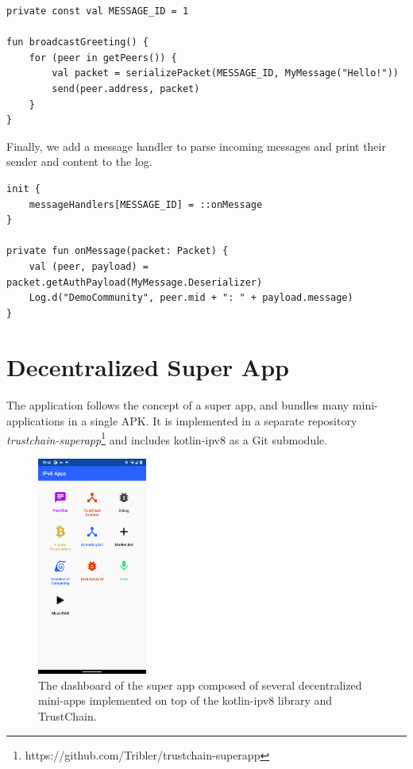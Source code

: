 \begin{verbatim}
private const val MESSAGE_ID = 1

fun broadcastGreeting() {
    for (peer in getPeers()) {
        val packet = serializePacket(MESSAGE_ID, MyMessage("Hello!"))
        send(peer.address, packet)
    }
}
\end{verbatim}

Finally, we add a message handler to parse incoming messages and print their sender and content to the log.

\begin{verbatim}
init {
    messageHandlers[MESSAGE_ID] = ::onMessage
}

private fun onMessage(packet: Packet) {
    val (peer, payload) = packet.getAuthPayload(MyMessage.Deserializer)
    Log.d("DemoCommunity", peer.mid + ": " + payload.message)
}
\end{verbatim}

\fi


\chapter{Decentralized Super App}

The application follows the concept of a super app, and bundles many mini-applications in a single APK. It is implemented in a separate repository \textit{trustchain-superapp}\footnote{https://github.com/Tribler/trustchain-superapp} and includes kotlin-ipv8 as a Git submodule.

\begin{figure}
    \centering
    \includegraphics[width=0.32\textwidth]{screens/superapp/superapp}
    \caption{The dashboard of the super app composed of several decentralized mini-apps implemented on top of the kotlin-ipv8 library and TrustChain.}
    \label{manyverse}
\end{figure}

